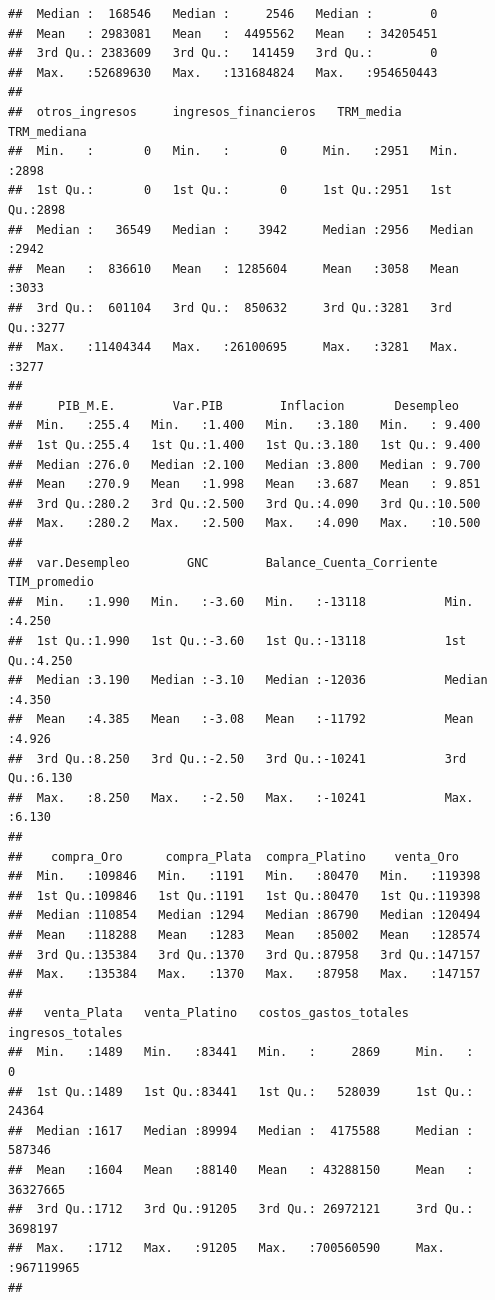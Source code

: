 \documentclass[
  11pt,
  a4paper,
]{book}
\begin{document}
\begin{verbatim}
##  Median :  168546   Median :     2546   Median :        0              
##  Mean   : 2983081   Mean   :  4495562   Mean   : 34205451              
##  3rd Qu.: 2383609   3rd Qu.:   141459   3rd Qu.:        0              
##  Max.   :52689630   Max.   :131684824   Max.   :954650443              
##                                                                        
##  otros_ingresos     ingresos_financieros   TRM_media     TRM_mediana  
##  Min.   :       0   Min.   :       0     Min.   :2951   Min.   :2898  
##  1st Qu.:       0   1st Qu.:       0     1st Qu.:2951   1st Qu.:2898  
##  Median :   36549   Median :    3942     Median :2956   Median :2942  
##  Mean   :  836610   Mean   : 1285604     Mean   :3058   Mean   :3033  
##  3rd Qu.:  601104   3rd Qu.:  850632     3rd Qu.:3281   3rd Qu.:3277  
##  Max.   :11404344   Max.   :26100695     Max.   :3281   Max.   :3277  
##                                                                       
##     PIB_M.E.        Var.PIB        Inflacion       Desempleo     
##  Min.   :255.4   Min.   :1.400   Min.   :3.180   Min.   : 9.400  
##  1st Qu.:255.4   1st Qu.:1.400   1st Qu.:3.180   1st Qu.: 9.400  
##  Median :276.0   Median :2.100   Median :3.800   Median : 9.700  
##  Mean   :270.9   Mean   :1.998   Mean   :3.687   Mean   : 9.851  
##  3rd Qu.:280.2   3rd Qu.:2.500   3rd Qu.:4.090   3rd Qu.:10.500  
##  Max.   :280.2   Max.   :2.500   Max.   :4.090   Max.   :10.500  
##                                                                  
##  var.Desempleo        GNC        Balance_Cuenta_Corriente  TIM_promedio  
##  Min.   :1.990   Min.   :-3.60   Min.   :-13118           Min.   :4.250  
##  1st Qu.:1.990   1st Qu.:-3.60   1st Qu.:-13118           1st Qu.:4.250  
##  Median :3.190   Median :-3.10   Median :-12036           Median :4.350  
##  Mean   :4.385   Mean   :-3.08   Mean   :-11792           Mean   :4.926  
##  3rd Qu.:8.250   3rd Qu.:-2.50   3rd Qu.:-10241           3rd Qu.:6.130  
##  Max.   :8.250   Max.   :-2.50   Max.   :-10241           Max.   :6.130  
##                                                                          
##    compra_Oro      compra_Plata  compra_Platino    venta_Oro     
##  Min.   :109846   Min.   :1191   Min.   :80470   Min.   :119398  
##  1st Qu.:109846   1st Qu.:1191   1st Qu.:80470   1st Qu.:119398  
##  Median :110854   Median :1294   Median :86790   Median :120494  
##  Mean   :118288   Mean   :1283   Mean   :85002   Mean   :128574  
##  3rd Qu.:135384   3rd Qu.:1370   3rd Qu.:87958   3rd Qu.:147157  
##  Max.   :135384   Max.   :1370   Max.   :87958   Max.   :147157  
##                                                                  
##   venta_Plata   venta_Platino   costos_gastos_totales ingresos_totales   
##  Min.   :1489   Min.   :83441   Min.   :     2869     Min.   :        0  
##  1st Qu.:1489   1st Qu.:83441   1st Qu.:   528039     1st Qu.:    24364  
##  Median :1617   Median :89994   Median :  4175588     Median :   587346  
##  Mean   :1604   Mean   :88140   Mean   : 43288150     Mean   : 36327665  
##  3rd Qu.:1712   3rd Qu.:91205   3rd Qu.: 26972121     3rd Qu.:  3698197  
##  Max.   :1712   Max.   :91205   Max.   :700560590     Max.   :967119965  
## 
\end{verbatim}
\end{document}
